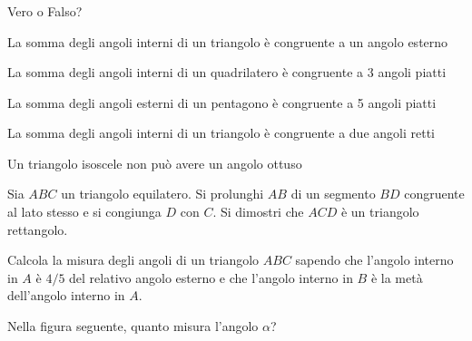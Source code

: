 \subsubsection*{}

\begin{esercizio}
\label{ese:3.47}
Vero o Falso?
\begin{enumeratea}
\item La somma degli angoli interni di un triangolo è congruente a un 
angolo esterno \hfill\boxV\quad\boxF
\item La somma degli angoli interni di un quadrilatero è congruente a 
3 angoli piatti \hfill\boxV\quad\boxF
\item La somma degli angoli esterni di un pentagono è congruente a 5 
angoli piatti\hfill\boxV\quad\boxF
\item La somma degli angoli interni di un triangolo è congruente a 
due angoli retti\hfill\boxV\quad\boxF
\item Un triangolo isoscele non può avere un angolo 
ottuso\hfill\boxV\quad\boxF
\end{enumeratea}
\end{esercizio}

\begin{esercizio}
\label{ese:3.48}
Sia $ABC$ un triangolo equilatero. Si prolunghi $AB$ di un segmento 
$BD$ congruente al lato stesso e si congiunga $D$ con $C$. Si 
dimostri che $ACD$ è un triangolo rettangolo.
\end{esercizio}

\begin{esercizio}
\label{ese:3.49}
Calcola la misura degli angoli di un triangolo $ABC$ sapendo che 
l'angolo interno in $A$ è $4/5$ del relativo angolo esterno e che 
l'angolo interno in $B$ è la metà dell'angolo interno in $A$.
\end{esercizio}

\begin{esercizio}
\label{ese:3.51}
Nella figura seguente, quanto misura l'angolo $\alpha$?  
\end{esercizio}
\vspace{-20mm}
\begin{inaccessibleblock}
\begin{center}\end{center}
\end{inaccessibleblock}

